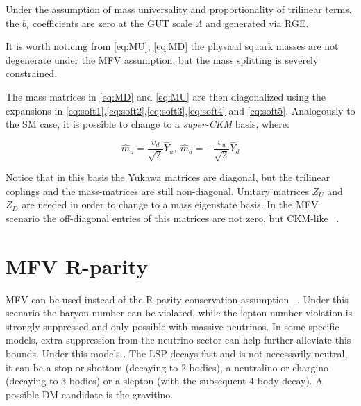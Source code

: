 Under the assumption of mass universality and proportionality of trilinear terms, the $b_i$ coefficients are zero at the GUT scale $\Lambda$ and generated via RGE. %

It is worth noticing from \ref{eq:MU}, \ref{eq:MD} the physical squark masses are not degenerate under the MFV assumption, but the mass splitting is severely constrained. 

The mass matrices in \ref{eq:MD} and \ref{eq:MU} are then diagonalized using the expansions in \ref{eq:soft1},\ref{eq:soft2},\ref{eq:soft3},\ref{eq:soft4} and \ref{eq:soft5}. Analogously to the SM case, it is possible to change to a \textit{super-CKM} basis, where:

\begin{equation}
\hat{m}_u = \frac{v_d}{\sqrt{2}}\hat{Y}_{u},\ \hat{m}_d = -\frac{v_u}{\sqrt{2}}\hat{Y}_{d}
\end{equation}

Notice that in this basis the Yukawa matrices are diagonal, but the trilinear coplings and the mass-matrices are still non-diagonal. Unitary matrices $Z_U$ and $Z_D$ are needed in order to change to a mass eigenstate basis. In the MFV scenario the off-diagonal entries of this matrices are not zero, but CKM-like ~\cite{Altmannshofer:2007cs}.


\section{MFV R-parity}
\label{sec:MFVRPV}
MFV can be used instead of the R-parity conservation assumption ~\cite{Csaki:2011ge}. Under this scenario the baryon number can be violated, while the lepton number violation is strongly suppressed and only possible with massive neutrinos.  In some specific models, extra suppression from the neutrino sector can help further alleviate this bounds. 
Under this models . The LSP decays fast and is not necessarily neutral, it can be a stop or sbottom (decaying to 2 bodies), a neutralino or chargino (decaying to 3 bodies) or a slepton (with the subsequent 4 body decay). A possible DM candidate is the gravitino. 



